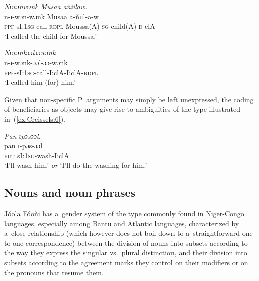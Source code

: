 \documentclass[output=paper]{langscibook}
\begin{document}
  \ea\label{ex:Creissels:5}
  
    \ea\label{ex:Creissels:5a}
    \textit{Nɩwɔnwɔnk Musaa añiilaw.}\\
    \gll n-ɩ-wɔn-wɔnk Musaa a-ñɩɩl-a-w\\
    \textsc{ppf}-sI:\textsc{1sg}-call-\textsc{rdpl} Moussa(A) \textsc{sg}-child(A)-\textsc{d}-clA\\
    \glt `I called the child for Moussa.'

    \ex\label{ex:Creissels:5b}
    
      \textit{Nɩwɔnkɔɔlɔɔwɔnk}\\
      \gll n-ɩ-wɔnk-ɔɔl-ɔɔ-wɔnk\\
      \textsc{ppf}-sI:\textsc{1sg}-call-I:clA-I:clA-\textsc{rdpl}\\
      \glt `I called him (for) him.'

  \z
\z

Given that non-specific P~arguments may simply be left unexpressed, the coding
of beneficiaries as objects may give rise to ambiguities of the type
illustrated in~(\ref{ex:Creissels:6}).

\ea
  \label{ex:Creissels:6}
  
    \textit{Pan ɩpɔsɔɔl.}\\
    \gll pan ɩ-pɔs-ɔɔl\\
    \textsc{fut} sI:\textsc{1sg}-wash-I:clA\\
    \glt `I'll wash him.' \textit{or} `I'll do the washing for him.'

\z

\subsection{Nouns and noun phrases}%
\label{sec:Creissels:nouns-nps}

Jóola Fóoñi has a~gender system of the type commonly found in Niger-Congo
languages, especially among Bantu and Atlantic languages, characterized by
a~close relationship (which however does not boil down to a~straightforward
one-to-one correspondence) between the division of nouns into subsets according
to the way they express the singular vs.\ plural distinction, and their
division into subsets according to the agreement marks they control on their
modifiers or on the pronouns that resume them.
\end{document}
